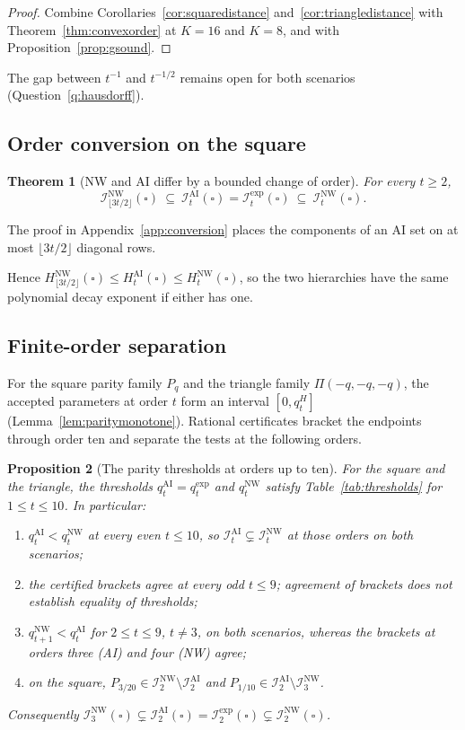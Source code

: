 \documentclass[11pt]{article}
\theoremstyle{plain}
\newtheorem{theorem}{Theorem}[section]
\newtheorem{proposition}[theorem]{Proposition}
\theoremstyle{definition}
\newcommand{\INW}{\mathcal I^{\mathrm{NW}}}
\newcommand{\IAI}{\mathcal I^{\mathrm{AI}}}
\newcommand{\Iexp}{\mathcal I^{\mathrm{exp}}}
\begin{document}
\begin{proof}
Combine Corollaries~\ref{cor:squaredistance} and~\ref{cor:triangledistance} with Theorem~\ref{thm:convexorder} at $K=16$ and $K=8$, and with Proposition~\ref{prop:gsound}.
\end{proof}

The gap between $t^{-1}$ and $t^{-1/2}$ remains open for both scenarios (Question~\ref{q:hausdorff}).

\subsection{Order conversion on the square}\label{sec:conversion}

\begin{theorem}[NW and AI differ by a bounded change of order]\label{thm:orderconversion}
For every $t\ge2$,
\[
\INW_{\lfloor3t/2\rfloor}(\square)\ \subseteq\ \IAI_t(\square)=\Iexp_t(\square)\ \subseteq\ \INW_t(\square).
\]
\end{theorem}

The proof in Appendix~\ref{app:conversion} places the components of an AI set on at most $\lfloor3t/2\rfloor$ diagonal rows.

Hence $H^{\mathrm{NW}}_{\lfloor3t/2\rfloor}(\square)\le H^{\mathrm{AI}}_t(\square)\le H^{\mathrm{NW}}_t(\square)$, so the two hierarchies have the same polynomial decay exponent if either has one.

\subsection{Finite-order separation}\label{sec:lowthresholds}

For the square parity family $P_q$ and the triangle family $\Pi(-q,-q,-q)$, the accepted parameters at order $t$ form an interval $[0,q_t^H]$ (Lemma~\ref{lem:paritymonotone}). Rational certificates bracket the endpoints through order ten and separate the tests at the following orders.

\begin{proposition}[The parity thresholds at orders up to ten]\label{prop:paritythresholds}
For the square and the triangle, the thresholds $q^{\mathrm{AI}}_t=q^{\mathrm{exp}}_t$ and $q^{\mathrm{NW}}_t$ satisfy Table~\ref{tab:thresholds} for $1\le t\le10$. In particular:
\begin{enumerate}[label=(\roman*),nosep]
\item $q^{\mathrm{AI}}_t<q^{\mathrm{NW}}_t$ at every even $t\le10$, so $\IAI_t\subsetneq\INW_t$ at those orders on both scenarios;
\item the certified brackets agree at every odd $t\le9$; agreement of brackets does not establish equality of thresholds;
\item $q^{\mathrm{NW}}_{t+1}<q^{\mathrm{AI}}_t$ for $2\le t\le9$, $t\ne3$, on both scenarios, whereas the brackets at orders three (AI) and four (NW) agree;
\item on the square, $P_{3/20}\in\INW_2\setminus\IAI_2$ and $P_{1/10}\in\IAI_2\setminus\INW_3$.
\end{enumerate}
Consequently $\INW_3(\square)\subsetneq\IAI_2(\square)=\Iexp_2(\square)\subsetneq\INW_2(\square)$.
\end{proposition}
\end{document}
